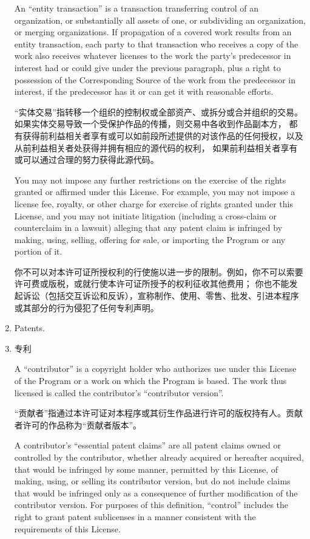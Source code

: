 \documentclass[11pt]{article}
\begin{document}
\begin{enumerate}
        An ``entity transaction'' is a transaction transferring control of an
        organization, or substantially all assets of one, or subdividing an
        organization, or merging organizations.  If propagation of a covered
        work results from an entity transaction, each party to that
        transaction who receives a copy of the work also receives whatever
        licenses to the work the party's predecessor in interest had or could
        give under the previous paragraph, plus a right to possession of the
        Corresponding Source of the work from the predecessor in interest, if
        the predecessor has it or can get it with reasonable efforts.

        “实体交易”指转移一个组织的控制权或全部资产、或拆分或合并组织的交易。如果实体交易导致一个受保护作品的传播，则交易中各收到作品副本方，
        都有获得前利益相关者享有或可以如前段所述提供的对该作品的任何授权，以及从前利益相关者处获得并拥有相应的源代码的权利，
        如果前利益相关者享有或可以通过合理的努力获得此源代码。

        You may not impose any further restrictions on the exercise of the
        rights granted or affirmed under this License.  For example, you may
        not impose a license fee, royalty, or other charge for exercise of
        rights granted under this License, and you may not initiate litigation
        (including a cross-claim or counterclaim in a lawsuit) alleging that
        any patent claim is infringed by making, using, selling, offering for
        sale, or importing the Program or any portion of it.

        你不可以对本许可证所授权利的行使施以进一步的限制。例如，你不可以索要许可费或版税，或就行使本许可证所授予的权利征收其他费用；
        你也不能发起诉讼（包括交互诉讼和反诉），宣称制作、使用、零售、批发、引进本程序或其部分的行为侵犯了任何专利声明。

  \item Patents.
  \item 专利

        A ``contributor'' is a copyright holder who authorizes use under this
        License of the Program or a work on which the Program is based.  The
        work thus licensed is called the contributor's ``contributor version''.

        “贡献者”指通过本许可证对本程序或其衍生作品进行许可的版权持有人。贡献者许可的作品称为“贡献者版本”。

        A contributor's ``essential patent claims'' are all patent claims
        owned or controlled by the contributor, whether already acquired or
        hereafter acquired, that would be infringed by some manner, permitted
        by this License, of making, using, or selling its contributor version,
        but do not include claims that would be infringed only as a
        consequence of further modification of the contributor version.  For
        purposes of this definition, ``control'' includes the right to grant
        patent sublicenses in a manner consistent with the requirements of
        this License.


\end{enumerate}
\end{document}
